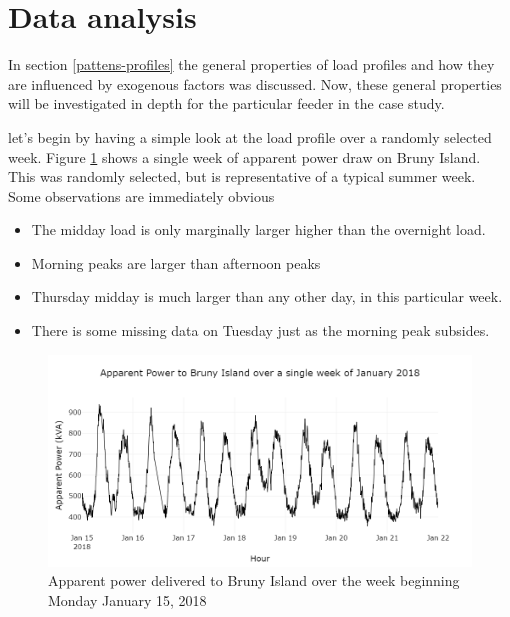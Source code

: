 \section{Data analysis}
In section \ref{pattens-profiles} the general properties of load profiles and how they are influenced by exogenous factors was discussed. Now, these general properties will be investigated in depth for the particular feeder in the case study.
\par
let's begin by having a simple look at the load profile over a randomly selected week.
Figure \ref{fig:simpleweek} shows a single week of apparent power draw on Bruny Island.
This was randomly selected, but is representative of a typical summer week.
Some observations are immediately obvious
\begin{itemize}
	\item The midday load is only marginally larger higher than the overnight load.
	\item Morning peaks are larger than afternoon peaks
	\item Thursday midday is much larger than any other day, in this particular week.
	\item There is some missing data on Tuesday just as the morning peak subsides.
\end{itemize}

\begin{figure}
	\centering
	\includegraphics[width=0.7\linewidth]{images/simple-week}
	\caption{Apparent power delivered to Bruny Island over the week beginning Monday January 15, 2018}
	\label{fig:simpleweek}
\end{figure}
